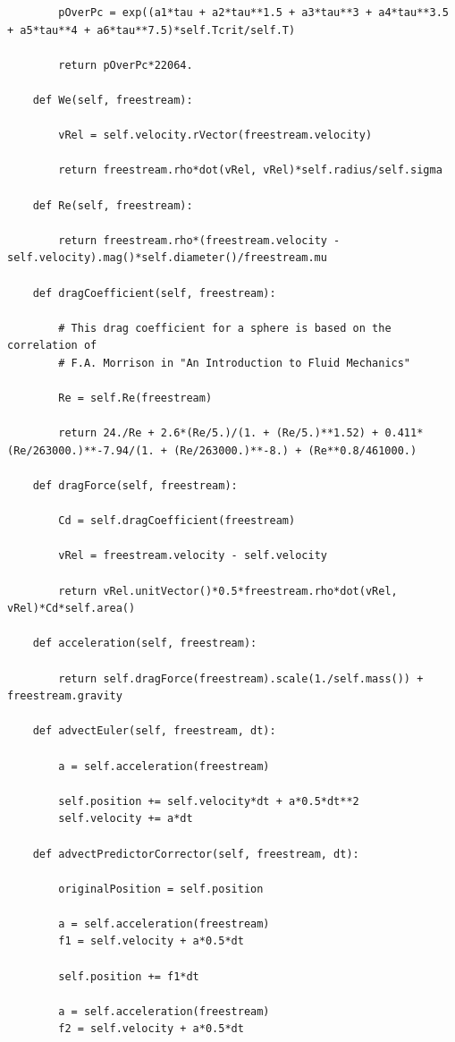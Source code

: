\documentclass[12pt]{article}
\begin{document}
\begin{lstlisting}
        pOverPc = exp((a1*tau + a2*tau**1.5 + a3*tau**3 + a4*tau**3.5 + a5*tau**4 + a6*tau**7.5)*self.Tcrit/self.T)

        return pOverPc*22064.

    def We(self, freestream):

        vRel = self.velocity.rVector(freestream.velocity)

        return freestream.rho*dot(vRel, vRel)*self.radius/self.sigma

    def Re(self, freestream):

        return freestream.rho*(freestream.velocity - self.velocity).mag()*self.diameter()/freestream.mu

    def dragCoefficient(self, freestream):

        # This drag coefficient for a sphere is based on the correlation of
        # F.A. Morrison in "An Introduction to Fluid Mechanics"

        Re = self.Re(freestream)

        return 24./Re + 2.6*(Re/5.)/(1. + (Re/5.)**1.52) + 0.411*(Re/263000.)**-7.94/(1. + (Re/263000.)**-8.) + (Re**0.8/461000.)

    def dragForce(self, freestream):

        Cd = self.dragCoefficient(freestream)

        vRel = freestream.velocity - self.velocity

        return vRel.unitVector()*0.5*freestream.rho*dot(vRel, vRel)*Cd*self.area()

    def acceleration(self, freestream):

        return self.dragForce(freestream).scale(1./self.mass()) + freestream.gravity

    def advectEuler(self, freestream, dt):

        a = self.acceleration(freestream)

        self.position += self.velocity*dt + a*0.5*dt**2
        self.velocity += a*dt

    def advectPredictorCorrector(self, freestream, dt):

        originalPosition = self.position

        a = self.acceleration(freestream)
        f1 = self.velocity + a*0.5*dt

        self.position += f1*dt

        a = self.acceleration(freestream)
        f2 = self.velocity + a*0.5*dt


\end{lstlisting}
\end{document}
